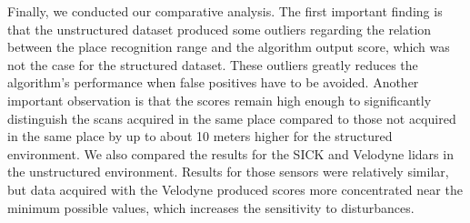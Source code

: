 Finally, we conducted our comparative analysis. The first important finding is that the unstructured dataset produced some outliers regarding the relation between the place recognition range and the algorithm output score, which was not the case for the structured dataset. These outliers greatly reduces the algorithm's performance when false positives have to be avoided. Another important observation is that the scores remain high enough to significantly distinguish the scans acquired in the same place compared to those not acquired in the same place by up to about 10 meters higher for the structured environment. We also compared the results for the SICK and Velodyne \gls*{lidar}s in the unstructured environment. Results for those sensors were relatively similar, but data acquired with the Velodyne produced scores more concentrated near the minimum possible values, which increases the sensitivity to disturbances.

